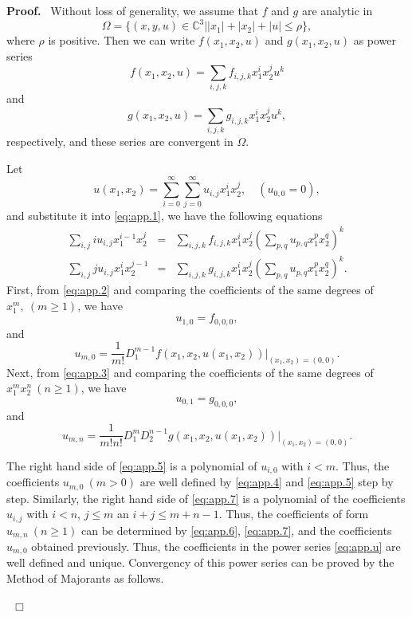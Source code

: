 \documentclass[preprint,12pt]{elsarticle}
\newenvironment{proof}[1][Proof]{\textbf{#1.}\ }{\ $\Box$}
\begin{document}
\begin{proof}
Without loss of generality, we assume that $f$ and $g$ are analytic in 
$$\Omega = \{(x,y,u)\in \mathbb{C}^3 \Big| |x_1| + |x_2| + |u| \leq \rho\},$$
where $\rho$ is positive.  Then we can write $f(x_1,x_2,u)$ and $g(x_1,x_2,u)$ as power series
\begin{equation}
f(x_1,x_2,u) = \sum_{i,j,k} f_{i,j,k} x_1^i x_2^ju^k
\end{equation}
and
\begin{equation}
g(x_1,x_2,u)=\sum_{i,j,k} g_{i,j,k} x_1^i x_2^j u^k,
\end{equation}
respectively, and these series are convergent in $\Omega$. 


Let
\begin{equation}
\label{eq:app.u}
u(x_1,x_2) = \sum_{i=0}^\infty \sum_{j=0}^\infty u_{i,j} x_1^i x_2^j,\quad (u_{0,0}= 0),\end{equation}
and substitute it into \eqref{eq:app.1}, we have the following equations
\begin{eqnarray}
\label{eq:app.2}
\sum_{i,j} i u_{i,j}x_1^{i-1}x_2^j &=& \sum_{i,j,k} f_{i,j,k} x_1^i x_2^j (\sum_{p,q} u_{p,q}x_1^px_2^q)^k\\
\label{eq:app.3}
\sum_{i,j} j u_{i,j} x_1^i x_2^{j-1} &=& \sum_{i,j,k} g_{i,j,k} x_1^i x_2^j (\sum_{p,q} u_{p,q} x_1^p x_2^q)^k.
\end{eqnarray}
First, from \eqref{eq:app.2} and comparing the coefficients of the same degrees of $x_1^m,\ (m \geq 1)$, we have
\begin{equation}
\label{eq:app.4}
u_{1,0} = f_{0,0,0}, 
\end{equation} 
and
\begin{equation}
\label{eq:app.5}
u_{m,0} = \dfrac{1}{m!} D_1^{m-1} f(x_1,x_2,u(x_1,x_2))|_{(x_1,x_2) = (0,0)}.
\end{equation}
Next, from \eqref{eq:app.3} and comparing the coefficients of the same degrees of $x_1^m x_2^n\ (n\geq 1)$, we have
\begin{equation}
\label{eq:app.6}
u_{0,1} = g_{0,0,0}, 
\end{equation}
and
\begin{equation}
\label{eq:app.7}
u_{m,n} = \dfrac{1}{m! n!} D_1^mD_2^{n-1} g(x_1,x_2,u(x_1,x_2))|_{(x_1,x_2) =(0,0)}.
\end{equation}

The right hand side of \eqref{eq:app.5} is a polynomial of $u_{i,0}$ with $i<m$. Thus, the coefficients $u_{m, 0}\ (m>0)$ are well defined by \eqref{eq:app.4} and \eqref{eq:app.5} step by step. Similarly, the right hand side of \eqref{eq:app.7} is a polynomial of the coefficients $u_{i,j}$ with $i < n$, $j\leq m$ an $i+j \leq m+ n - 1$. Thus, the coefficients of form $u_{m,n}\ (n\geq 1)$ can be determined by \eqref{eq:app.6}, \eqref{eq:app.7}, and the coefficients $u_{m,0}$ obtained previously. Thus, the coefficients in the power series \eqref{eq:app.u} are well defined and unique. Convergency of this power series can be proved by the Method of Majorants as follows. 


\end{proof}
\end{document}

